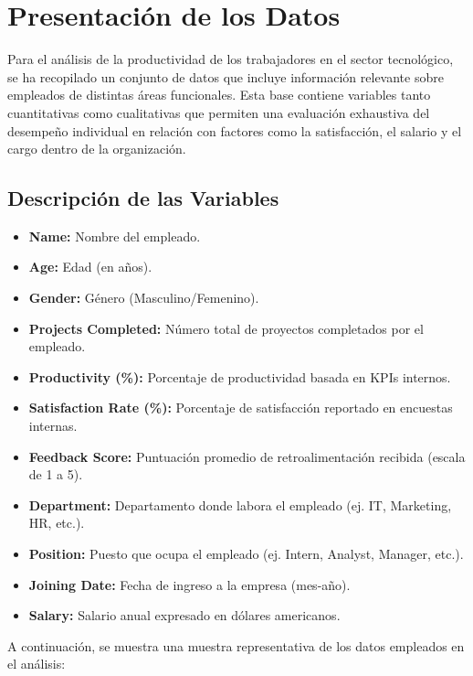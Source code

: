 \section*{Presentación de los Datos}

Para el análisis de la productividad de los trabajadores en el sector tecnológico, se ha recopilado un conjunto de datos que incluye información relevante sobre empleados de distintas áreas funcionales. Esta base contiene variables tanto cuantitativas como cualitativas que permiten una evaluación exhaustiva del desempeño individual en relación con factores como la satisfacción, el salario y el cargo dentro de la organización.

\subsection*{Descripción de las Variables}

\begin{itemize}
    \item \textbf{Name:} Nombre del empleado.
    \item \textbf{Age:} Edad (en años).
    \item \textbf{Gender:} Género (Masculino/Femenino).
    \item \textbf{Projects Completed:} Número total de proyectos completados por el empleado.
    \item \textbf{Productivity (\%):} Porcentaje de productividad basada en KPIs internos.
    \item \textbf{Satisfaction Rate (\%):} Porcentaje de satisfacción reportado en encuestas internas.
    \item \textbf{Feedback Score:} Puntuación promedio de retroalimentación recibida (escala de 1 a 5).
    \item \textbf{Department:} Departamento donde labora el empleado (ej. IT, Marketing, HR, etc.).
    \item \textbf{Position:} Puesto que ocupa el empleado (ej. Intern, Analyst, Manager, etc.).
    \item \textbf{Joining Date:} Fecha de ingreso a la empresa (mes-año).
    \item \textbf{Salary:} Salario anual expresado en dólares americanos.
\end{itemize}

A continuación, se muestra una muestra representativa de los datos empleados en el análisis:

